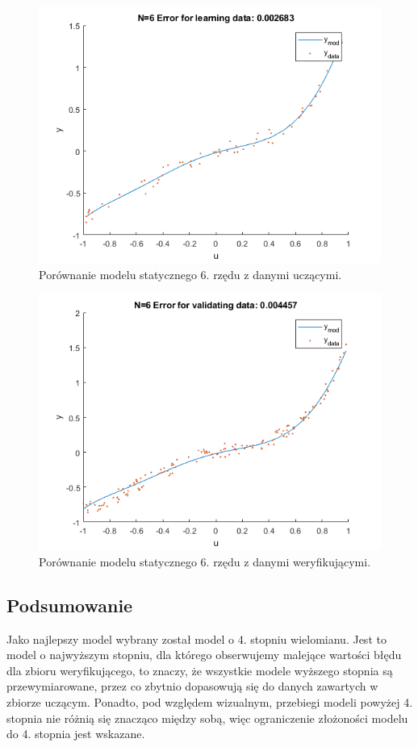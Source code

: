 \begin{figure}[H]
\centering
\includegraphics[width=15cm]{images/s11.png}
\caption{Porównanie modelu statycznego 6. rzędu z danymi uczącymi.}
\label{fig:s11}
\end{figure}
\begin{figure}[H]
\centering
\includegraphics[width=15cm]{images/s12.png}
\caption{Porównanie modelu statycznego 6. rzędu z danymi weryfikującymi.}
\label{fig:s12}
\end{figure}
\subsection{Podsumowanie}
Jako najlepszy model wybrany został model o 4. stopniu wielomianu. Jest to model o najwyższym stopniu, dla którego obserwujemy malejące wartości błędu dla zbioru weryfikującego, to znaczy, że wszystkie modele wyższego stopnia są przewymiarowane, przez co zbytnio dopasowują się do danych zawartych w zbiorze uczącym. Ponadto, pod względem wizualnym, przebiegi modeli powyżej 4. stopnia nie różnią się znacząco między sobą, więc ograniczenie złożoności modelu do 4. stopnia jest wskazane.
\newpage
